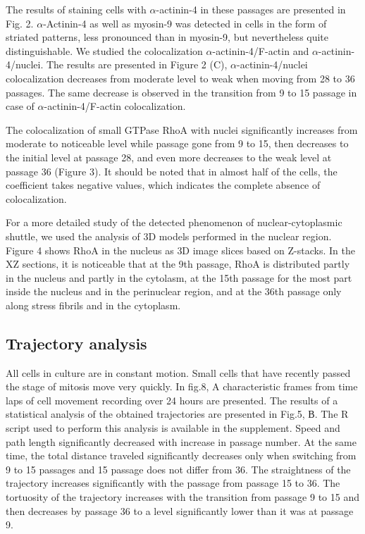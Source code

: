 \documentclass[alpha-refs]{wiley-article}
\begin{document}
The results of staining cells with $\alpha$-actinin-4 in these passages are presented in Fig. 2.
$\alpha$-Actinin-4 as well as myosin-9 was detected in cells in the form of striated patterns, less pronounced than in myosin-9, but nevertheless quite distinguishable.
We studied the colocalization $\alpha$-actinin-4/F-actin and $\alpha$-actinin-4/nuclei.
The results are presented in Figure 2 (C), $\alpha$-actinin-4/nuclei colocalization decreases from moderate level to weak when moving from 28 to 36 passages.
The same decrease is observed in the transition from 9 to 15 passage in case of $\alpha$-actinin-4/F-actin colocalization.

The colocalization of small GTPase RhoA with nuclei significantly increases from moderate to noticeable level while passage gone from 9 to 15, then decreases to the initial level at passage 28, and even more decreases to the weak level at passage 36 (Figure 3).
It should be noted that in almost half of the cells, the coefficient takes negative values, which indicates the complete absence of colocalization.

For a more detailed study of the detected phenomenon of nuclear-cytoplasmic shuttle, we used the analysis of 3D models performed in the nuclear region.
Figure 4 shows RhoA in the nucleus as 3D image slices based on Z-stacks.
In the XZ sections, it is noticeable that at the 9th passage, RhoA is distributed partly in the nucleus and partly in the cytolasm, at the 15th passage for the most part inside the nucleus and in the perinuclear region, and at the 36th passage only along stress fibrils and in the cytoplasm.

\subsection{Trajectory analysis}

All cells in culture are in constant motion.
Small cells that have recently passed the stage of mitosis move very quickly.
In fig.8, A characteristic frames from time laps of cell movement recording over 24 hours are presented.
The results of a statistical analysis of the obtained trajectories are presented in Fig.5, В.
The R script used to perform this analysis is available in the supplement.
Speed and path length significantly decreased with increase in passage number.
At the same time, the total distance traveled significantly decreases only when switching from 9 to 15 passages and 15 passage does not differ from 36.
The straightness of the trajectory increases significantly with the passage from passage 15 to 36.
The tortuosity of the trajectory increases with the transition from passage 9 to 15 and then decreases by passage 36 to a level significantly lower than it was at passage 9.
\end{document}
